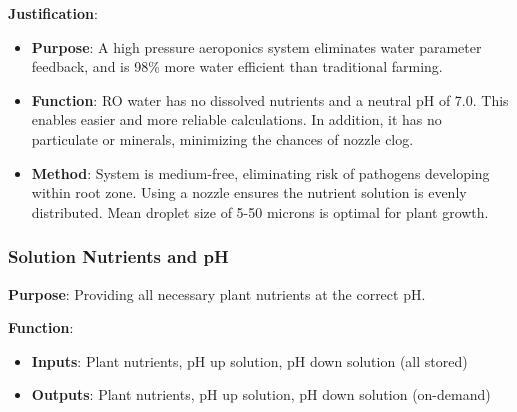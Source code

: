 \documentclass{report}
\begin{document}
\textbf{Justification}: 
\begin{itemize}
    \item \textbf{Purpose}: A high pressure aeroponics system eliminates water parameter feedback, and is 98\% more water efficient than traditional farming.
    \item \textbf{Function}: RO water has no dissolved nutrients and a neutral pH of 7.0. This enables easier and more reliable calculations. In addition, it has no particulate or minerals, minimizing the chances of nozzle clog.
    \item \textbf{Method}: System is medium-free, eliminating risk of pathogens developing within root zone. Using a nozzle ensures the nutrient solution is evenly distributed. Mean droplet size of 5-50 microns is optimal for plant growth. %
\end{itemize}

\newpage

\subsubsection{Solution Nutrients and pH}
\label{sec:nutrientsph}

\textbf{Purpose}: Providing all necessary plant nutrients at the correct pH.

\textbf{Function}:
\begin{itemize}
    \item \textbf{Inputs}: Plant nutrients, pH up solution, pH down solution (all stored)
    \item \textbf{Outputs}: Plant nutrients, pH up solution, pH down solution (on-demand)
\end{itemize}
\end{document}

